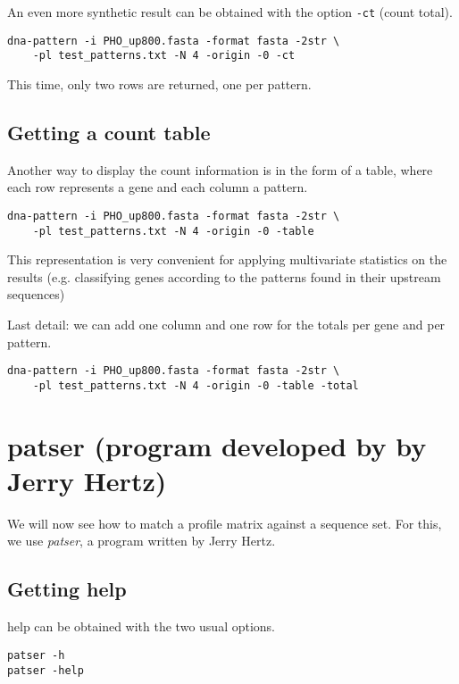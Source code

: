 An even more synthetic result can be obtained with the option
\texttt{-ct} (count total).

\begin{verbatim}
dna-pattern -i PHO_up800.fasta -format fasta -2str \
    -pl test_patterns.txt -N 4 -origin -0 -ct
\end{verbatim}

This time, only two rows are returned, one per pattern. 

\subsection{Getting a count table}

Another way to display the count information is in the form of a
table, where each row represents a gene and each column a pattern.

\begin{verbatim}
dna-pattern -i PHO_up800.fasta -format fasta -2str \
    -pl test_patterns.txt -N 4 -origin -0 -table
\end{verbatim}

This representation is very convenient for applying multivariate
statistics on the results (e.g. classifying genes according to the
patterns found in their upstream sequences)

Last detail: we can add one column and one row for the totals per
gene and per pattern.

\begin{verbatim}
dna-pattern -i PHO_up800.fasta -format fasta -2str \
    -pl test_patterns.txt -N 4 -origin -0 -table -total
\end{verbatim}




\section{patser (program developed by by Jerry Hertz)}

We will now see how to match a profile matrix against a sequence
set. For this, we use \textit{patser}, a program written by Jerry
Hertz. 

\subsection{Getting help}

help can be obtained with the two usual options.

\begin{verbatim}
patser -h
patser -help
\end{verbatim}

